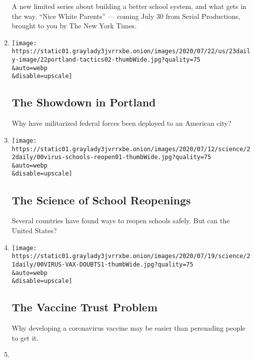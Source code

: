 \begin{enumerate}
  A new limited series about building a better school system, and what
  gets in the way. ``Nice White Parents'' --- coming July 30 from Serial
  Productions, brought to you by The New York Times.
\item
  \href{/2020/07/23/podcasts/the-daily/portland-protests.html}{}

  \texttt{[image: https://static01.graylady3jvrrxbe.onion/images/2020/07/22/us/23daily-image/22portland-tactics02-thumbWide.jpg?quality=75\\\&auto=webp\\\&disable=upscale]}

  \hypertarget{the-showdown-in-portland}{%
  \subsection{The Showdown in Portland}\label{the-showdown-in-portland}}

  Why have militarized federal forces been deployed to an American city?
\item
  \href{/2020/07/22/podcasts/the-daily/school-reopenings-coronavirus.html}{}

  \texttt{[image: https://static01.graylady3jvrrxbe.onion/images/2020/07/12/science/22daily/00virus-schools-reopen01-thumbWide.jpg?quality=75\\\&auto=webp\\\&disable=upscale]}

  \hypertarget{the-science-of-school-reopenings}{%
  \subsection{The Science of School
  Reopenings}\label{the-science-of-school-reopenings}}

  Several countries have found ways to reopen schools safely. But can
  the United States?
\item
  \href{/2020/07/21/podcasts/the-daily/coronavirus-vaccine.html}{}

  \texttt{[image: https://static01.graylady3jvrrxbe.onion/images/2020/07/19/science/21daily/00VIRUS-VAX-DOUBTS1-thumbWide.jpg?quality=75\\\&auto=webp\\\&disable=upscale]}

  \hypertarget{the-vaccine-trust-problem}{%
  \subsection{The Vaccine Trust
  Problem}\label{the-vaccine-trust-problem}}

  Why developing a coronavirus vaccine may be easier than persuading
  people to get it.
\item
  \href{/2020/07/20/podcasts/the-daily/john-lewis.html}{}


\end{enumerate}
